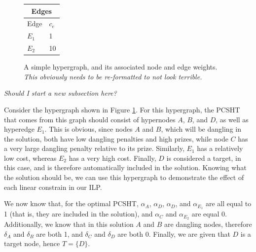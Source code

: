 \documentclass[12pt,twoside]{reedthesis}
\theoremstyle{definition}
\begin{document}
\begin{figure}[!htbp]
  \begin{minipage}[b]{0.30\linewidth}
    \centering%
    \begin{tabular}{ |l|l| }%
      \hline%
      \multicolumn{2}{|c|}{Edges} \\%
      \hline \hline
      Edge & $c_e$ \\ \hline%
      $E_1$ & 1 \\ \hline%
      $E_2$ & 10 \\ \hline%
    \end{tabular}%
    \par\vspace{0pt}
  \end{minipage}
\caption{A simple hypergraph, and its associated node and edge weights. \emph{This obviously needs to be re-formatted to not look terrible.}}
\label{fig:dummy-before}
\end{figure}

\emph{Should I start a new subsection here?}\par

Consider the hypergraph shown in Figure \ref{fig:dummy-before}. For this hypergraph, the PCSHT that comes from this graph should consist of hypernodes $A$, $B$, and $D$, as well as hyperedge $E_1$. This is obvious, since nodes $A$ and $B$, which will be dangling in the solution, both have low dangling penalties and high prizes, while node $C$ has a very large dangling penalty relative to its prize. Similarly, $E_1$ has a relatively low cost, whereas $E_2$ has a very high cost. Finally, $D$ is considered a target, in this case, and is therefore automatically included in the solution. Knowing what the solution should be, we can use this hypergraph to demonstrate the effect of each linear constrain in our ILP.\par

We now know that, for the optimal PCSHT, $\alpha_A$, $\alpha_D$, $\alpha_D$, and $\alpha_{E_1}$ are all equal to 1 (that is, they are included in the solution), and $\alpha_C$ and $\alpha_{E_2}$ are equal 0. Additionally, we know that in this solution $A$ and $B$ are dangling nodes, therefore $\delta_A$ and $\delta_B$ are both 1, and $\delta_C$ and $\delta_D$ are both 0. Finally, we are given that $D$ is a target node, hence $T=\{D\}$.\par
\end{document}
